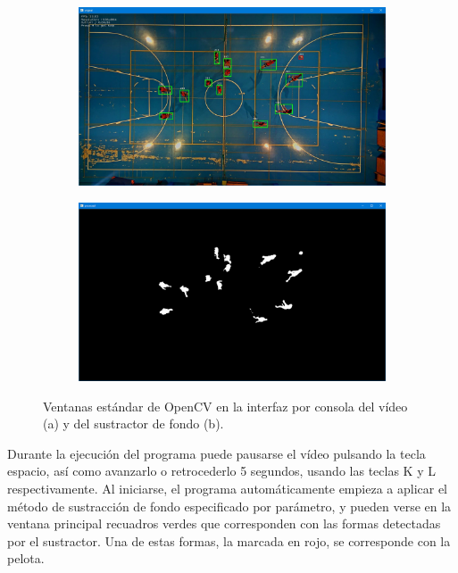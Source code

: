 \begin{figure}
\begin{subfigure}{.5\textwidth}
  \centering
  \includegraphics[width=.9\linewidth]{images/original}
  \caption { }
  \label{fig:ventanaoriginal}
\end{subfigure}%
\begin{subfigure}{.5\textwidth}
  \centering
  \includegraphics[width=.9\linewidth]{images/processed}
  \caption { }
  \label{fig:ventanaprocessed}
\end{subfigure}
\caption{Ventanas estándar de OpenCV en la interfaz por consola del vídeo (a) y del sustractor de fondo (b).}
\label{fig:ventanas}
\end{figure}

Durante la ejecución del programa puede pausarse el vídeo pulsando la tecla espacio, así como avanzarlo o retrocederlo 5 segundos, usando las teclas K y L respectivamente. Al iniciarse, el programa automáticamente empieza a aplicar el método de sustracción de fondo especificado por parámetro, y pueden verse en la ventana principal recuadros verdes que corresponden con las formas detectadas por el sustractor. Una de estas formas, la marcada en rojo, se corresponde con la pelota.

